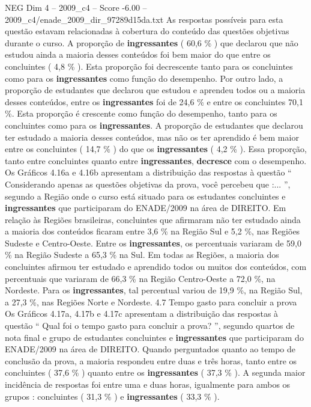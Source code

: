 \begin{textsample}{NEG Dim 4 – 2009\_c4 – Score -6.00 – 2009\_c4/enade\_2009\_dir\_97289d15da.txt}
As respostas possíveis para esta questão estavam relacionadas à cobertura do conteúdo das questões objetivas durante o curso.
A proporção de \textbf{ingressantes} ( 60,6 \% ) que declarou que não estudou ainda a maioria desses conteúdos foi bem maior do que entre os concluintes ( 4,8 \% ).
Esta proporção foi decrescente tanto para os concluintes como para os \textbf{ingressantes} como função do desempenho.
Por outro lado, a proporção de estudantes que declarou que estudou e aprendeu todos ou a maioria desses conteúdos, entre os \textbf{ingressantes} foi de 24,6 \% e entre os concluintes 70,1 \%.
Esta proporção é crescente como função do desempenho, tanto para os concluintes como para os \textbf{ingressantes}.
A proporção de estudantes que declarou ter estudado a maioria desses conteúdos, mas não os ter aprendido é bem maior entre os concluintes ( 14,7 \% ) do que os \textbf{ingressantes} ( 4,2 \% ).
Essa proporção, tanto entre concluintes quanto entre \textbf{ingressantes}, \textbf{decresce} com o desempenho.
Os Gráficos 4.16a e 4.16b apresentam a distribuição das respostas à questão “ Considerando apenas as questões objetivas da prova, você percebeu que :... ”, segundo a Região onde o curso está situado para os estudantes concluintes e \textbf{ingressantes} que participaram do ENADE/2009 na área de DIREITO.
Em relação às Regiões brasileiras, concluintes que afirmaram não ter estudado ainda a maioria dos conteúdos ficaram entre 3,6 \% na Região Sul e 5,2 \%, nas Regiões Sudeste e Centro-Oeste.
Entre os \textbf{ingressantes}, os percentuais variaram de 59,0 \% na Região Sudeste a 65,3 \% na Sul.
Em todas as Regiões, a maioria dos concluintes afirmou ter estudado e aprendido todos ou muitos dos conteúdos, com percentuais que variaram de 66,3 \% na Região Centro-Oeste a 72,0 \%, na Nordeste.
Para os \textbf{ingressantes}, tal percentual variou de 19,9 \%, na Região Sul, a 27,3 \%, nas Regiões Norte e Nordeste. 4.7 Tempo gasto para concluir a prova Os Gráficos 4.17a, 4.17b e 4.17c apresentam a distribuição das respostas à questão “ Qual foi o tempo gasto para concluir a prova? ”, segundo quartos de nota final e grupo de estudantes concluintes e \textbf{ingressantes} que participaram do ENADE/2009 na área de DIREITO.
Quando perguntados quanto ao tempo de conclusão da prova, a maioria respondeu entre duas e três horas, tanto entre os concluintes ( 37,6 \% ) quanto entre os \textbf{ingressantes} ( 37,3 \% ).
A segunda maior incidência de respostas foi entre uma e duas horas, igualmente para ambos os grupos : concluintes ( 31,3 \% ) e \textbf{ingressantes} ( 33,3 \% ).

\end{textsample}
